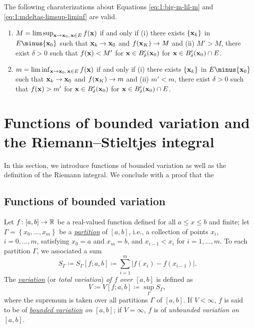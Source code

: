 The following charaterizations about Equations \eqref{eq:1:big-m-lil-m} and
\eqref{eq:1:mdeltas-limsup-liminf} are valid.
\begin{theorem}[1.14]
\hfill
\begin{enumerate}[label=\textnormal{(\alph*)},noitemsep]
\item $M=\limsup_{\mathbf{x}\to\mathbf{x}_0,\,\mathbf{x}\in E}f(\mathbf{x})$ if and only if
  \textnormal{(i)} there exists $\{\mathbf{x}_k\}$ in $E\minus\{\bfx_0\}$ such
  that $\mathbf{x}_k\to\mathbf{x}_0$ and $f(\mathbf{x}_K)\to M$ and \textnormal{(ii)} $M'>M$,
  there exist $\delta>0$ such that $f(\mathbf{x})<M'$ for $\mathbf{x}\in
  B'_\delta(\mathbf{x}_0)$ for $\mathbf{x}\in B_\delta'(\mathbf{x}_0)\cap E$.
\item $m=\liminf_{\mathbf{x}\to\mathbf{x}_0,\,\mathbf{x}\in E}f(\mathbf{x})$ if and only if
  \textnormal{(i)} there exists $\{\mathbf{x}_k\}$ in $E\minus\{\bfx_0\}$ such
  that $\mathbf{x}_k\to\mathbf{x}_0$ and $f(\mathbf{x}_K)\to m$ and \textnormal{(ii)} $m'<m$,
  there exist $\delta>0$ such that $f(\mathbf{x})>m'$ for $\mathbf{x}\in
  B'_\delta(\mathbf{x}_0)$ for $\mathbf{x}\in B_\delta'(\mathbf{x}_0)\cap E$.\end{enumerate}
\end{theorem}

\section{Functions of bounded variation and the Riemann--Stieltjes
  integral}
In this section, we introduce functions of bounded variation as well as the
definition of the Riemann integral. We conclude with a proof that the

\subsection{Functions of bounded variation}
Let $f\colon[a,b]\to\mathbb{R}$ be a real-valued function defined for all $a\leq
x\leq b$ and finite; let $\Gamma=\left\{x_0,\dotsc,x_m\right\}$ be a
\href{https://en.wikipedia.org/wiki/Partition_of_an_interval}{\emph{partition}}
of $[a,b]$, i.e., a collection of points $x_i$, $i=0,\dotsc,m$, satisfying
$x_0=a$ and $x_m=b$, and $x_{i-1}<x_i$ for $i=1,\dotsc,m$. To each
partition $\Gamma$, we associated a sum
\begin{equation}
\label{eq:bv:sum}
S_\Gamma\coloneqq S_\Gamma[f;a,b]\coloneqq\sum_{i=1}^m\left|f(x_i)-f(x_{i-1})\right|.
\end{equation}
The
\href{https://en.wikipedia.org/wiki/Bounded_variation#Formal_definition}{\emph{variation}}
(or \emph{total variation}) \emph{of $f$ over $[a,b]$} is defined as
\begin{equation}
  \label{eq:bv:variation}
V\coloneqq V[f;a,b]\coloneqq\sup_\Gamma S_\Gamma,
\end{equation}
where the supremum is taken over all partitions $\Gamma$ of $[a,b]$. If
$V<\infty$, $f$ is said to be of
\href{https://en.wikipedia.org/wiki/Bounded_variation}{\emph{bounded
    variation}} \emph{on $[a,b]$}; if $V=\infty$, $f$ is of \emph{unbounded
variation on $[a,b]$}.

